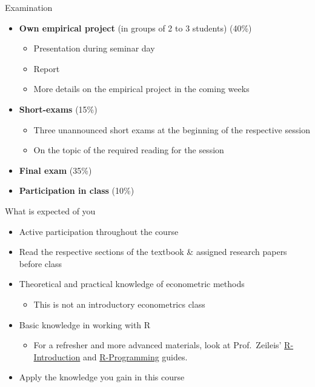 \documentclass[
  ignorenonframetext,
]{beamer}
\providecommand{\tightlist}{%
  \setlength{\itemsep}{0pt}\setlength{\parskip}{0pt}}
\begin{document}
\begin{frame}{Examination}
\label{examination}
\begin{itemize}
\tightlist
\item
  \textbf{Own empirical project} (in groups of 2 to 3 students) (40\%)

  \begin{itemize}
  \tightlist
  \item
    Presentation during seminar day
  \item
    Report
  \item
    More details on the empirical project in the coming weeks
  \end{itemize}
\item
  \textbf{Short-exams} (15\%)

  \begin{itemize}
  \tightlist
  \item
    Three unannounced short exams at the beginning of the respective
    session
  \item
    On the topic of the required reading for the session
  \end{itemize}
\item
  \textbf{Final exam} (35\%)
\item
  \textbf{Participation in class} (10\%)
\end{itemize}
\end{frame}

\begin{frame}{What is expected of you}
\label{what-is-expected-of-you}
\begin{itemize}
\tightlist
\item
  Active participation throughout the course
\item
  Read the respective sections of the textbook \& assigned research
  papers before class
\item
  Theoretical and practical knowledge of econometric methods

  \begin{itemize}
  \tightlist
  \item
    This is not an introductory econometrics class
  \end{itemize}
\item
  Basic knowledge in working with R

  \begin{itemize}
  \tightlist
  \item
    For a refresher and more advanced materials, look at Prof.~Zeileis'
    \href{https://www.zeileis.org/teaching/R-Intro/}{R-Introduction} and
    \href{https://www.zeileis.org/teaching/R-Programming/}{R-Programming}
    guides.
  \end{itemize}
\item
  Apply the knowledge you gain in this course
\end{itemize}
\end{frame}
\end{document}
